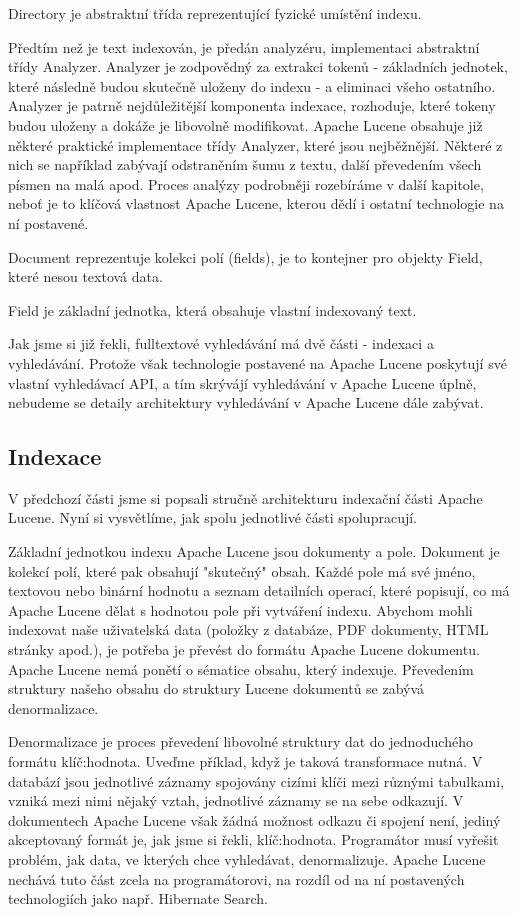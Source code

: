 \documentclass[11pt,draft,oneside]{fithesis2}
\begin{document}
Directory je abstraktní třída reprezentující fyzické umístění indexu.  

Předtím než je text indexován, je předán analyzéru, implementaci abstraktní třídy Analyzer. Analyzer je zodpovědný za extrakci tokenů - základních jednotek, které následně budou skutečně uloženy do indexu - a eliminaci všeho ostatního. Analyzer je patrně nejdůležitější
komponenta indexace, rozhoduje, které tokeny budou uloženy a dokáže je libovolně modifikovat. Apache Lucene obsahuje již některé praktické implementace třídy Analyzer, které jsou nejběžnější. Některé z nich  se například zabývají odstraněním šumu z textu, další převedením všech písmen na malá apod. Proces analýzy podrobněji rozebíráme v další kapitole, neboť je to klíčová vlastnost Apache Lucene, kterou dědí i ostatní technologie na ní postavené.

Document reprezentuje kolekci polí (fields), je to kontejner pro objekty Field, které nesou textová data. 

Field je základní jednotka, která obsahuje vlastní indexovaný text.

Jak jsme si již řekli, fulltextové vyhledávání má dvě části - indexaci a vyhledávání. Protože však technologie postavené na Apache Lucene poskytují své vlastní vyhledávací API, a tím skrývájí vyhledávání v Apache Lucene úplně, nebudeme se detaily architektury vyhledávání v Apache Lucene dále zabývat. 

\subsection{Indexace}
V předchozí části jsme si popsali stručně architekturu indexační části Apache Lucene. Nyní si vysvětlíme, jak spolu jednotlivé části spolupracují.

Základní jednotkou indexu Apache Lucene jsou dokumenty a pole. Dokument je kolekcí polí, které pak obsahují "skutečný" obsah. Každé pole má své jméno, textovou nebo binární hodnotu a seznam detailních operací, které popisují, co má Apache Lucene dělat s hodnotou pole při vytváření indexu. Abychom mohli indexovat naše uživatelská data (položky z databáze, PDF dokumenty, HTML stránky apod.), je potřeba je převést do formátu Apache Lucene dokumentu. Apache Lucene nemá ponětí o sématice obsahu, který indexuje. Převedením struktury našeho obsahu do struktury Lucene dokumentů se zabývá denormalizace.

Denormalizace je proces převedení libovolné struktury dat do jednoduchého formátu klíč:hodnota. Uveďme příklad, když je taková transformace nutná. V databází jsou jednotlivé záznamy spojovány cizími klíči mezi různými tabulkami, vzniká mezi nimi nějaký vztah, jednotlivé záznamy se na sebe odkazují. V dokumentech Apache Lucene však žádná možnost odkazu či spojení není, jediný akceptovaný formát je, jak jsme si řekli, klíč:hodnota. Programátor musí vyřešit problém, jak data, ve kterých chce vyhledávat, denormalizuje. Apache Lucene nechává tuto část zcela na programátorovi, na rozdíl od na ní postavených technologiích jako např. Hibernate Search.
\end{document}
